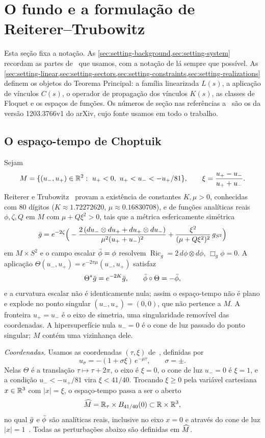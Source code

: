 \section{O fundo e a formulação de Reiterer--Trubowitz}\label{sec:setting}

Esta seção fixa a notação. As \cref{sec:setting-background,sec:setting-system} recordam as partes
de~\cite{RT2019} que usamos, com a notação de lá sempre que possível. As \cref{sec:setting-linear,sec:setting-sectors,sec:setting-constraints,sec:setting-realizations}
definem os objetos do Teorema Principal: a família linearizada $L(s)$, a aplicação de vínculos $C(s)$, o
operador de propagação dos vínculos $K(s)$, as classes de Floquet e os espaços de funções.
Os números de seção nas referências a~\cite{RT2019} são os da versão 1203.3766v1 do arXiv, cujo fonte usamos
em todo o trabalho.

\subsection{O espaço-tempo de Choptuik}\label{sec:setting-background}

Sejam
\[
  M=\{(u_-,u_+)\in\R^2:\ u_+<0,\ u_+<u_-<-u_+/81\},\qquad
  \xi=\frac{u_+-u_-}{u_++u_-}.
\]
Reiterer e Trubowitz~\cite[Main result]{RT2019} provam a existência de constantes $K,\mu>0$, conhecidas com
$80$ dígitos ($K\approx1.72272620$, $\mu\approx0.16830708$), e de funções analíticas reais
$\phi,\zeta,Q$ em $M$ com $\mu+Q\xi^2>0$, tais que a métrica esfericamente simétrica
\begin{equation}\label{eq:metric}
  \bar g=e^{-2\zeta}\Big(-\frac{2\,(du_-\otimes du_++du_+\otimes du_-)}{\mu^2(u_++u_-)^2}
  +\frac{\xi^2}{(\mu+Q\xi^2)^2}\,g_{S^2}\Big)
\end{equation}
em $M\times S^2$ e o campo escalar $\bar\phi=\phi$ resolvem
$\operatorname{Ric}_g=2\,d\phi\otimes d\phi$, $\Box_g\phi=0$. A aplicação
$\Theta(u_-,u_+)=e^{-2\pi\mu}(u_-,u_+)$ satisfaz
\[
  \Theta^*\bar g=e^{-2K}\bar g,\qquad \bar\phi\circ\Theta=-\bar\phi,
\]
e a curvatura escalar não é identicamente nula; assim o espaço-tempo não é plano e explode no
ponto singular $(u_-,u_+)=(0,0)$, que não pertence a $M$. A fronteira $u_+=u_-$ é o eixo de simetria, uma
singularidade removível das coordenadas. A hipersuperfície nula $u_-=0$ é o cone de luz passado do ponto
singular; $M$ contém uma vizinhança dele.

\emph{Coordenadas.} Usamos as coordenadas $(\tau,\xi)$ de~\cite{RT2019}, definidas por
\begin{equation}\label{eq:tauxi}
  u_\sigma=-(1+\sigma\xi)\,e^{-\mu\tau},\qquad\sigma=\pm.
\end{equation}
Nelas $\Theta$ é a translação $\tau\mapsto\tau+2\pi$, o eixo é $\xi=0$, o cone de luz $u_-=0$ é
$\xi=1$, e a condição $u_-<-u_+/81$ vira $\xi<41/40$. Trocando $\xi\ge0$ pela variável
cartesiana $x\in\mathbb{R}^3$ com $|x|=\xi$, o espaço-tempo passa a ser o aberto
\[
  \widehat M=\mathbb{R}_\tau\times B_{41/40}(0)\subset\mathbb{R}\times\mathbb{R}^3,
\]
no qual $\bar g$ e $\bar\phi$ são analíticas reais, inclusive no eixo $x=0$ e através do cone de luz
$|x|=1$~\cite{RT2019}. Todas as perturbações abaixo são definidas em $\widehat M$.

